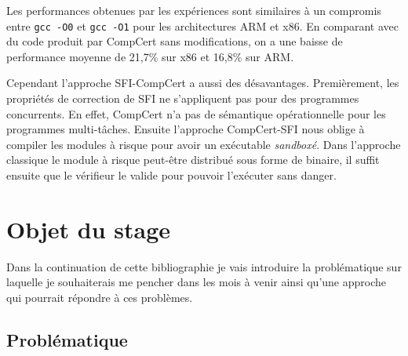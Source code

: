 \documentclass[11pt]{sdm}
\begin{document}
Les performances obtenues par les expériences sont similaires à un compromis entre \texttt{gcc -O0} et \texttt{gcc -O1} pour les architectures ARM et x86. En comparant avec du code produit par CompCert sans modifications, on a une baisse de performance moyenne de 21,7\% sur x86 et 16,8\% sur ARM. 

Cependant l'approche SFI-CompCert a aussi des désavantages. Premièrement, les propriétés de correction de SFI ne s'appliquent pas pour des programmes concurrents. En effet, CompCert n'a pas de sémantique opérationnelle pour les programmes multi-tâches. Ensuite l'approche CompCert-SFI nous oblige à compiler les modules à risque pour avoir un exécutable \textit{sandboxé}. Dans l'approche classique le module à risque peut-être distribué sous forme de binaire, il suffit ensuite que le vérifieur le valide pour pouvoir l'exécuter sans danger.

\section{Objet du stage}

Dans la continuation de cette bibliographie je vais introduire la problématique sur laquelle je souhaiterais me pencher dans les mois à venir ainsi qu'une approche qui pourrait répondre à ces problèmes.

\subsection{Problématique}
\end{document}
